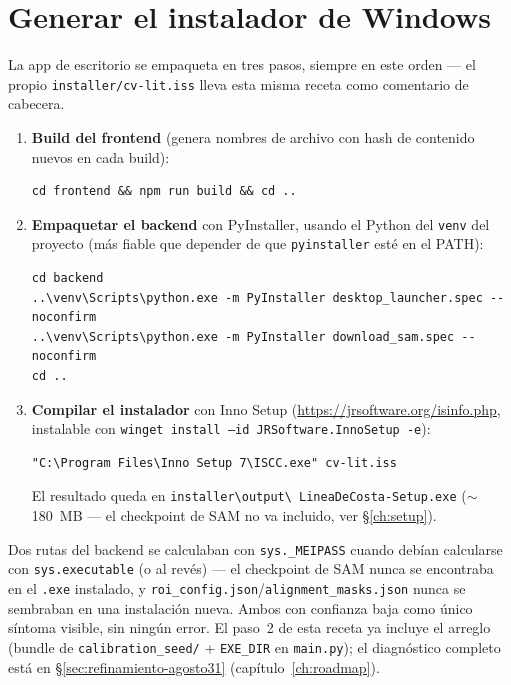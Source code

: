 \section{Generar el instalador de Windows}
\label{sec:build-installer}

La app de escritorio se empaqueta en tres pasos, siempre en este orden — el propio
\texttt{installer/cv-lit.iss} lleva esta misma receta como comentario de cabecera.

\begin{enumerate}[leftmargin=1.5em]
  \item \textbf{Build del frontend} (genera nombres de archivo con hash de contenido nuevos
        en cada build):
\begin{verbatim}
cd frontend && npm run build && cd ..
\end{verbatim}
  \item \textbf{Empaquetar el backend} con PyInstaller, usando el Python del \texttt{venv} del
        proyecto (más fiable que depender de que \texttt{pyinstaller} esté en el PATH):
\begin{verbatim}
cd backend
..\venv\Scripts\python.exe -m PyInstaller desktop_launcher.spec --noconfirm
..\venv\Scripts\python.exe -m PyInstaller download_sam.spec --noconfirm
cd ..
\end{verbatim}
  \item \textbf{Compilar el instalador} con Inno Setup (\url{https://jrsoftware.org/isinfo.php},
        instalable con \texttt{winget install --id JRSoftware.InnoSetup -e}):
\begin{verbatim}
"C:\Program Files\Inno Setup 7\ISCC.exe" cv-lit.iss
\end{verbatim}
        El resultado queda en \texttt{installer\textbackslash output\textbackslash
        LineaDeCosta-Setup.exe} ($\sim$180~MB — el checkpoint de SAM no va incluido, ver
        \S\ref{ch:setup}).
\end{enumerate}

\begin{warnbox}
Dos rutas del backend se calculaban con \texttt{sys.\_MEIPASS} cuando debían calcularse con
\texttt{sys.executable} (o al revés) — el checkpoint de SAM nunca se encontraba en el
\texttt{.exe} instalado, y \texttt{roi\_config.json}/\texttt{alignment\_masks.json} nunca se
sembraban en una instalación nueva. Ambos con confianza baja como único síntoma visible, sin
ningún error. El paso~2 de esta receta ya incluye el arreglo (bundle de
\texttt{calibration\_seed/} + \texttt{EXE\_DIR} en \texttt{main.py}); el diagnóstico completo
está en \S\ref{sec:refinamiento-agosto31} (capítulo~\ref{ch:roadmap}).
\end{warnbox}

